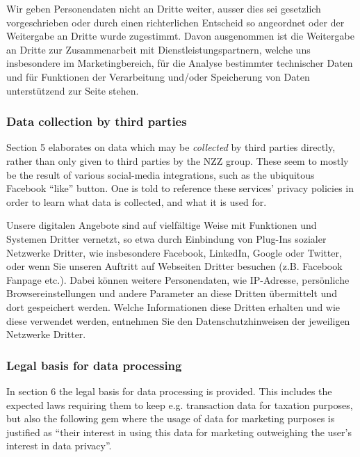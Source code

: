 \documentclass[a4paper]{scrreprt}
\begin{document}
\begin{displayquote}
		Wir geben Personendaten nicht an Dritte weiter, ausser dies sei gesetzlich
		vorgeschrieben oder durch einen richterlichen Entscheid so angeordnet oder der
		Weitergabe an Dritte wurde zugestimmt. Davon ausgenommen ist die Weitergabe an
		Dritte \textelp{} zur Zusammenarbeit mit Dienstleistungspartnern, welche uns
		insbesondere im Marketingbereich, für die Analyse bestimmter technischer Daten
		und für Funktionen der Verarbeitung und/oder Speicherung von Daten
		unterstützend zur Seite stehen.
\end{displayquote}

\subsubsection{Data collection by third parties}

Section 5 elaborates on data which may be \emph{collected} by third parties
directly, rather than only given to third parties by the NZZ group. These seem
to mostly be the result of various social-media integrations, such as the
ubiquitous Facebook ``like'' button. One is told to reference these services'
privacy policies in order to learn what data is collected, and what it is used
for.

\begin{displayquote}
		Unsere digitalen Angebote sind auf vielfältige Weise mit Funktionen und
		Systemen Dritter vernetzt, so etwa durch Einbindung von Plug-Ins
		sozialer Netzwerke Dritter, wie insbesondere Facebook, LinkedIn, Google
		oder Twitter, oder wenn Sie unseren Auftritt auf Webseiten Dritter
		besuchen (z.B. Facebook Fanpage etc.). \textelp{} Dabei können weitere
		Personendaten, wie IP-Adresse, persönliche Browsereinstellungen und
		andere Parameter an diese Dritten übermittelt und dort gespeichert
		werden. Welche Informationen diese Dritten erhalten und wie diese
		verwendet werden, entnehmen Sie den Datenschutzhinweisen der jeweiligen
		Netzwerke Dritter.
\end{displayquote}

\subsubsection{Legal basis for data processing}

In section 6 the legal basis for data processing is provided. This includes the
expected laws requiring them to keep e.g. transaction data for taxation
purposes, but also the following gem where the usage of data for marketing
purposes is justified as ``their interest in using this data for marketing
outweighing the user's interest in data privacy''.
\end{document}
